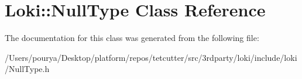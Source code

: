 \hypertarget{classLoki_1_1NullType}{}\section{Loki\+:\+:Null\+Type Class Reference}
\label{classLoki_1_1NullType}


The documentation for this class was generated from the following file\+:\begin{DoxyCompactItemize}
\item 
/\+Users/pourya/\+Desktop/platform/repos/tetcutter/src/3rdparty/loki/include/loki/Null\+Type.\+h\end{DoxyCompactItemize}
